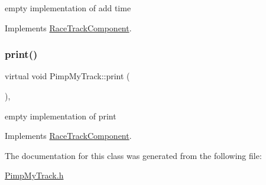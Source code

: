 empty implementation of add time 

Implements \mbox{\hyperlink{class_race_track_component_aa815404c45ba7df3786c3add177eb7e6}{Race\+Track\+Component}}.

\mbox{\label{class_pimp_my_track_a1b292c061991d5797183610f41180b91}} 
\subsubsection{\texorpdfstring{print()}{print()}}
{\footnotesize\ttfamily virtual void Pimp\+My\+Track\+::print (\begin{DoxyParamCaption}{ }\end{DoxyParamCaption})\hspace{0.3cm}{\ttfamily [inline]}, {\ttfamily [virtual]}}

empty implementation of print 

Implements \mbox{\hyperlink{class_race_track_component_a02a8d9520cfd80f31dd94b5fa1e76d47}{Race\+Track\+Component}}.



The documentation for this class was generated from the following file\+:\begin{DoxyCompactItemize}
\item 
\mbox{\hyperlink{_pimp_my_track_8h}{Pimp\+My\+Track.\+h}}\end{DoxyCompactItemize}
